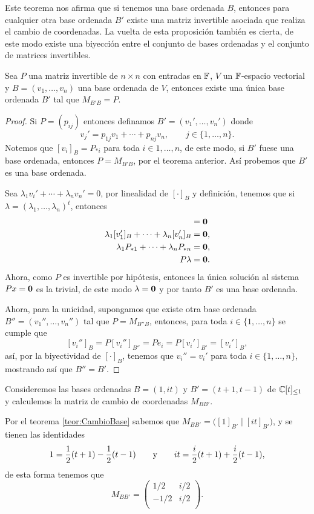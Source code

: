 Este teorema nos afirma que si tenemos una base ordenada $B$, entonces para cualquier otra base ordenada $B'$ existe una matriz invertible asociada que realiza el cambio de coordenadas. La vuelta de esta proposición también es cierta, de este modo existe una biyección entre el conjunto de bases ordenadas y el conjunto de matrices invertibles.

\begin{prop}\label{prop:ExBase}
  Sea $P$ una matriz invertible de $n\times n$ con entradas en $\mathbb{F}$, $V$ un $\mathbb{F}$-espacio vectorial y $B = (v_1, \ldots, v_n)$ una base ordenada de $V$, entonces existe una única base ordenada $B'$ tal que $M_{B'B} = P$.
\end{prop}
\begin{proof}
  Si $P = (p_{ij})$ entonces definamos $B' = (v_1', \ldots, v_n')$ donde
    \[ v_j' = p_{1j}v_1 + \cdots +  p_{nj}v_n,     \qquad j \in \{1,\ldots, n\}. \]
  Notemos que $[v_i]_B = P_{*i}$ para toda $i \in 1,\ldots,n$, de este modo, si $B'$ fuese una base ordenada, entonces $P = M_{B'B}$, por el teorema anterior. Así probemos que $B'$ es una base ordenada.

  Sea $\lambda_1 v_i' + \cdots + \lambda_n v_n' = 0$, por linealidad de $[\cdot]_B$ y definición, tenemos que si $\lambda = (\lambda_1, \ldots, \lambda_n)^t$, entonces
  \begin{align*}
    [\lambda_1 v_i' + \cdots + \lambda_n v_n'] &= \bec 0 \\
    \lambda_1 [v_1']_B + \cdots + \lambda_n [v_n']_B &= \bec 0 ,\\
    \lambda_1 P_{*1} + \cdots + \lambda_n P_{*n} &= \bec 0 ,\\
    P\lambda &= \bec 0.
  \end{align*}
  Ahora, como $P$ es invertible por hipótesis, entonces la única solución al sistema $Px = \mathbf{0}$ es la trivial, de este modo $\lambda = \mathbf{0}$ y por tanto $B'$ es una base ordenada.

  Ahora, para la unicidad, supongamos que existe otra base ordenada $B'' = (v_1'', \ldots, v_n'')$ tal que $P = M_{B''B}$, entonces, para toda $i \in \{1,\ldots,n\}$ se cumple que
  \[ [v_i'']_B =  P[v_i'']_{B''} = Pe_i = P[v_i']_{B'} = [v_i']_B, \]
  así, por la biyectividad de $[\cdot]_B$, tenemos que $v_i'' = v_i'$ para toda $i \in \{1,\ldots,n\}$, mostrando así que $B'' = B'$.
\end{proof}

\begin{example}
  Consideremos las bases ordenadas $B = ( 1, it )$ y $B' = (t+1, t-1)$ de $\mathbb{C}[t]_{\leq 1}$ y calculemos la matriz de cambio de coordenadas $M_{BB'}$.

  \examplesolution
  Por el teorema \ref{teor:CambioBase} sabemos que $M_{BB'} = \bigl( [1]_{B'} \mid [it]_{B'} \bigr)$, y se tienen las identidades
  \[
    1 = \frac{1}{2} (t+1) - \frac{1}{2}(t-1)
      \qquad\text{y}\qquad
    it =  \frac{i}{2}(t+1) + \frac{i}{2}(t-1),
  \]
  de esta forma tenemos que 
  \[ M_{BB'} = \begin{pmatrix}
    1/2  & i/2 \\
    -1/2 & i/2 \\
  \end{pmatrix}. \]
\end{example}

